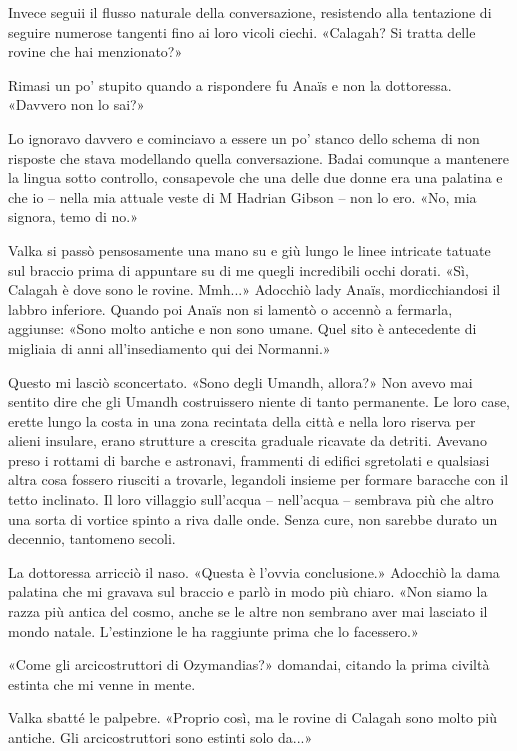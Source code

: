 Invece seguii il flusso naturale della conversazione, resistendo alla
tentazione di seguire numerose tangenti fino ai loro vicoli ciechi.
«Calagah? Si tratta delle rovine che hai menzionato?»

Rimasi un po' stupito quando a rispondere fu Anaïs e non la dottoressa.
«Davvero non lo sai?»

Lo ignoravo davvero e cominciavo a essere un po' stanco dello schema di
non risposte che stava modellando quella conversazione. Badai comunque a
mantenere la lingua sotto controllo, consapevole che una delle due donne
era una palatina e che io -- nella mia attuale veste di M Hadrian Gibson
-- non lo ero. «No, mia signora, temo di no.»

Valka si passò pensosamente una mano su e giù lungo le linee intricate
tatuate sul braccio prima di appuntare su di me quegli incredibili occhi
dorati. «Sì, Calagah è dove sono le rovine. Mmh...» Adocchiò lady Anaïs,
mordicchiandosi il labbro inferiore. Quando poi Anaïs non si lamentò o
accennò a fermarla, aggiunse: «Sono molto antiche e non sono umane. Quel
sito è antecedente di migliaia di anni all'insediamento qui dei
Normanni.»

Questo mi lasciò sconcertato. «Sono degli Umandh, allora?» Non avevo mai
sentito dire che gli Umandh costruissero niente di tanto permanente. Le
loro case, erette lungo la costa in una zona recintata della città e
nella loro riserva per alieni insulare, erano strutture a crescita
graduale ricavate da detriti. Avevano preso i rottami di barche e
astronavi, frammenti di edifici sgretolati e qualsiasi altra cosa
fossero riusciti a trovarle, legandoli insieme per formare baracche con
il tetto inclinato. Il loro villaggio sull'acqua -- nell'acqua --
sembrava più che altro una sorta di vortice spinto a riva dalle onde.
Senza cure, non sarebbe durato un decennio, tantomeno secoli.

La dottoressa arricciò il naso. «Questa è l'ovvia conclusione.» Adocchiò
la dama palatina che mi gravava sul braccio e parlò in modo più chiaro.
«Non siamo la razza più antica del cosmo, anche se le altre non sembrano
aver mai lasciato il mondo natale. L'estinzione le ha raggiunte prima
che lo facessero.»

«Come gli arcicostruttori di Ozymandias?» domandai, citando la prima
civiltà estinta che mi venne in mente.

Valka sbatté le palpebre. «Proprio così, ma le rovine di Calagah sono
molto più antiche. Gli arcicostruttori sono estinti solo da...»

